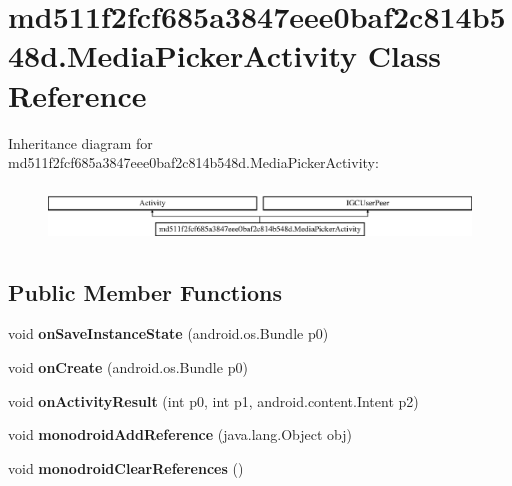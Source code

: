 \hypertarget{classmd511f2fcf685a3847eee0baf2c814b548d_1_1MediaPickerActivity}{}\section{md511f2fcf685a3847eee0baf2c814b548d.\+Media\+Picker\+Activity Class Reference}
\label{classmd511f2fcf685a3847eee0baf2c814b548d_1_1MediaPickerActivity}
Inheritance diagram for md511f2fcf685a3847eee0baf2c814b548d.\+Media\+Picker\+Activity\+:\begin{figure}[H]
\begin{center}
\leavevmode
\includegraphics[height=1.505376cm]{classmd511f2fcf685a3847eee0baf2c814b548d_1_1MediaPickerActivity}
\end{center}
\end{figure}
\subsection*{Public Member Functions}
\begin{DoxyCompactItemize}
\item 
\hypertarget{classmd511f2fcf685a3847eee0baf2c814b548d_1_1MediaPickerActivity_a71939ec3085bf4090e2fe779b883e482}{}void {\bfseries on\+Save\+Instance\+State} (android.\+os.\+Bundle p0)\label{classmd511f2fcf685a3847eee0baf2c814b548d_1_1MediaPickerActivity_a71939ec3085bf4090e2fe779b883e482}

\item 
\hypertarget{classmd511f2fcf685a3847eee0baf2c814b548d_1_1MediaPickerActivity_a4cf19f8e82d24c501261fc44b5a412aa}{}void {\bfseries on\+Create} (android.\+os.\+Bundle p0)\label{classmd511f2fcf685a3847eee0baf2c814b548d_1_1MediaPickerActivity_a4cf19f8e82d24c501261fc44b5a412aa}

\item 
\hypertarget{classmd511f2fcf685a3847eee0baf2c814b548d_1_1MediaPickerActivity_ad57e954fe704e1d43800c7c35f2ebf2a}{}void {\bfseries on\+Activity\+Result} (int p0, int p1, android.\+content.\+Intent p2)\label{classmd511f2fcf685a3847eee0baf2c814b548d_1_1MediaPickerActivity_ad57e954fe704e1d43800c7c35f2ebf2a}

\item 
\hypertarget{classmd511f2fcf685a3847eee0baf2c814b548d_1_1MediaPickerActivity_a8263b3fd5975636e9fad0225cbf3fbb0}{}void {\bfseries monodroid\+Add\+Reference} (java.\+lang.\+Object obj)\label{classmd511f2fcf685a3847eee0baf2c814b548d_1_1MediaPickerActivity_a8263b3fd5975636e9fad0225cbf3fbb0}

\item 
\hypertarget{classmd511f2fcf685a3847eee0baf2c814b548d_1_1MediaPickerActivity_a4556979c2ec90d5b815e7213e6d5ee3e}{}void {\bfseries monodroid\+Clear\+References} ()\label{classmd511f2fcf685a3847eee0baf2c814b548d_1_1MediaPickerActivity_a4556979c2ec90d5b815e7213e6d5ee3e}

\end{DoxyCompactItemize}


